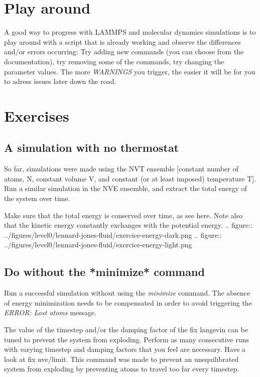 \section{Play around}

\noindent A good way to progress with LAMMPS and molecular dynamics
simulations is to play around with a script that is already
working and observe the differences and/or errors occurring:
Try adding new commands (you can choose from the documentation),
try removing some of the commands, try changing the parameter values.
The more \textit{WARNINGS} you trigger, the easier it will be for you
to adress issues later down the road.

\section{Exercises}

\noindent \subsection{A simulation with no thermostat}

So far, simulations were made using the NVT ensemble [constant number 
of atoms, N, constant volume V, and constant (or at least imposed)
temperature T].
Run a similar simulation in the NVE ensemble, and extract the
total energy of the system over time.

\begin{tcolorbox}[colback=mylightblue!5!white,colframe=mylightblue!75!black,title=Expected output]
Make sure that the total energy is conserved over time, as see here. Note also 
that the kinetic energy constantly exchanges with the potential energy.
.. figure:: ../figures/level0/lennard-jones-fluid/exercice-energy-dark.png
.. figure:: ../figures/level0/lennard-jones-fluid/exercice-energy-light.png
\end{tcolorbox}

\noindent \subsection{Do without the *minimize* command}

Run a successful simulation without using the \textit{minimize} command.
The absence of energy minimization needs to be compensated
in order to avoid triggering the \textit{ERROR: Lost atoms} message.

\begin{tcolorbox}[colback=mylightblue!5!white,colframe=mylightblue!75!black,title=Hints]
The value of the timestep and/or the damping factor of the fix langevin
can be tuned to prevent the system from exploding.
Perform as many consecutive runs with varying timestep and damping
factors that you feel are necessary.
Have a look at fix nve/limit. This command was
made to prevent an unequilibrated system from exploding
by preventing atoms to travel too far every timestep.
\end{tcolorbox}

